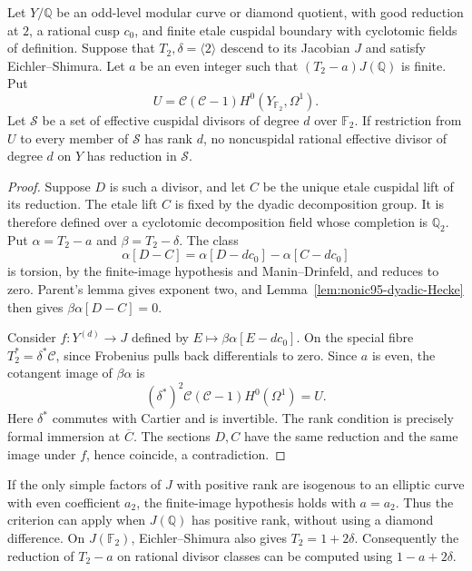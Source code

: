 \begin{lemma}\label{lem:nonic77-finite-image-Cartier}
Let $Y/\mathbb Q$ be an odd-level modular curve or diamond quotient,
with good reduction at $2$, a rational cusp $c_0$, and finite etale
cuspidal boundary with cyclotomic fields of definition. Suppose that
$T_2,\delta=\langle2\rangle$ descend to its Jacobian $J$ and satisfy
Eichler--Shimura. Let $a$ be an even integer such that
$(T_2-a)J(\mathbb Q)$ is finite. Put
\[
 U=\mathcal C(\mathcal C-1)H^0(Y_{\mathbb F_2},\Omega^1).
\]
Let $\mathcal S$ be a set of effective cuspidal divisors of degree $d$
over $\mathbb F_2$. If restriction from $U$ to every member of
$\mathcal S$ has rank $d$, no noncuspidal rational effective divisor
of degree $d$ on $Y$ has reduction in $\mathcal S$.
\end{lemma}
\begin{proof}
Suppose $D$ is such a divisor, and let $C$ be the unique etale
cuspidal lift of its reduction. The etale lift $C$ is fixed by the dyadic decomposition group.
It is therefore defined over a cyclotomic decomposition field whose
completion is $\mathbb Q_2$. Put $\alpha=T_2-a$ and $\beta=T_2-\delta$.
The class
\[
 \alpha[D-C]=\alpha[D-dc_0]-\alpha[C-dc_0]
\]
is torsion, by the finite-image hypothesis and Manin--Drinfeld,
and reduces to zero. Parent's lemma gives exponent two, and
Lemma~\ref{lem:nonic95-dyadic-Hecke} then gives
$\beta\alpha[D-C]=0$.

Consider $f:Y^{(d)}\longrightarrow J$ defined by
$E\longmapsto\beta\alpha[E-dc_0]$.
On the special fibre $T_2^*=\delta^*\mathcal C$, since Frobenius
pulls back differentials to zero. Since $a$ is even, the cotangent
image of $\beta\alpha$ is
\[
 (\delta^*)^2\mathcal C(\mathcal C-1)H^0(\Omega^1)=U.
\]
Here $\delta^*$ commutes with Cartier and is invertible.
The rank condition is precisely formal immersion at $\overline C$.
The sections $D,C$ have the same reduction and the same image under
$f$, hence coincide, a contradiction.
\end{proof}

\begin{remark}
If the only simple factors of $J$ with positive rank are isogenous
to an elliptic curve with even coefficient $a_2$, the finite-image
hypothesis holds with $a=a_2$. Thus the criterion can apply when
$J(\mathbb Q)$ has positive rank, without using a diamond difference.
On $J(\mathbb F_2)$, Eichler--Shimura also gives
$T_2=1+2\delta$. Consequently the reduction of $T_2-a$ on rational
divisor classes can be computed using $1-a+2\delta$.
\end{remark}
